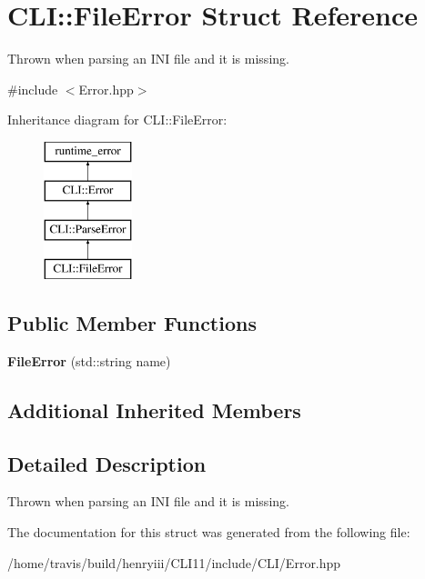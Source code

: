 \hypertarget{struct_c_l_i_1_1_file_error}{}\section{C\+LI\+:\+:File\+Error Struct Reference}
\label{struct_c_l_i_1_1_file_error}


Thrown when parsing an I\+NI file and it is missing.  




{\ttfamily \#include $<$Error.\+hpp$>$}

Inheritance diagram for C\+LI\+:\+:File\+Error\+:\begin{figure}[H]
\begin{center}
\leavevmode
\includegraphics[height=4.000000cm]{struct_c_l_i_1_1_file_error}
\end{center}
\end{figure}
\subsection*{Public Member Functions}
\begin{DoxyCompactItemize}
\item 
\mbox{\label{struct_c_l_i_1_1_file_error_a016a6b1162d93112a0446a0bc2afc68d}} 
{\bfseries File\+Error} (std\+::string name)
\end{DoxyCompactItemize}
\subsection*{Additional Inherited Members}


\subsection{Detailed Description}
Thrown when parsing an I\+NI file and it is missing. 

The documentation for this struct was generated from the following file\+:\begin{DoxyCompactItemize}
\item 
/home/travis/build/henryiii/\+C\+L\+I11/include/\+C\+L\+I/Error.\+hpp\end{DoxyCompactItemize}

